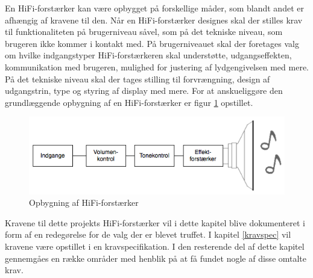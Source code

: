 En HiFi-forstærker kan være opbygget på forskellige måder, som blandt andet er afhængig af kravene til den. Når en HiFi-forstærker designes skal der stilles krav til funktionaliteten på brugerniveau såvel, som på det tekniske niveau, som brugeren ikke kommer i kontakt med. 
På brugerniveauet skal der foretages valg om hvilke indgangstyper HiFi-forstærkeren skal understøtte, udgangseffekten, kommunikation med brugeren, mulighed for justering af lydgengivelsen med mere. På det tekniske niveau skal der tages stilling til forvrængning, design af udgangstrin, type og styring af display med mere. 
For at anskueliggøre den grundlæggende opbygning af en HiFi-forstærker er figur \ref{fig:forstaerker_opbygning} opstillet.

\begin{figure}[h]
\centering
\includegraphics[scale=.6]{indledende_analyse/generel_effektforstaerker/forstaerker_opbygning.png}
\caption{Opbygning af HiFi-forstærker}
\label{fig:forstaerker_opbygning}
\end{figure}

Kravene til dette projekts HiFi-forstærker vil i dette kapitel blive dokumenteret i form af en redegørelse for de valg der er blevet truffet. I kapitel \ref{kravspec} vil kravene være opstillet i en kravspecifikation. I den resterende del af dette kapitel gennemgåes en række områder med henblik på at få fundet nogle af disse omtalte krav.